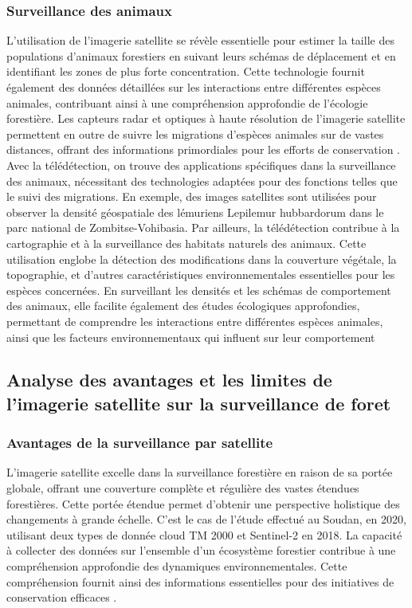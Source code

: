\subsubsection{Surveillance des animaux}
L'utilisation de l'imagerie satellite se révèle essentielle pour estimer la taille des populations d'animaux forestiers en suivant leurs schémas de déplacement et en identifiant les zones de plus forte concentration. Cette technologie fournit également des données détaillées sur les interactions entre différentes espèces animales, contribuant ainsi à une compréhension approfondie de l'écologie forestière. Les capteurs radar et optiques à haute résolution de l'imagerie satellite permettent en outre de suivre les migrations d'espèces animales sur de vastes distances, offrant des informations primordiales pour les efforts de conservation \cite{42}.
\\

Avec la télédétection, on trouve des applications spécifiques dans la surveillance des animaux, nécessitant des technologies adaptées pour des fonctions telles que le suivi des migrations. En exemple, des images satellites sont utilisées pour observer la densité géospatiale des lémuriens Lepilemur hubbardorum dans le parc national de Zombitse-Vohibasia. Par ailleurs, la télédétection contribue à la cartographie et à la surveillance des habitats naturels des animaux. Cette utilisation englobe la détection des modifications dans la couverture végétale, la topographie, et d'autres caractéristiques environnementales essentielles pour les espèces concernées. En surveillant les densités et les schémas de comportement des animaux, elle facilite également des études écologiques approfondies, permettant de comprendre les interactions entre différentes espèces animales, ainsi que les facteurs environnementaux qui influent sur leur comportement \cite{43}
\\

\subsection{Analyse des avantages et les limites de l’imagerie satellite sur la surveillance de foret }
\subsubsection{Avantages de la surveillance par satellite}
L'imagerie satellite excelle dans la surveillance forestière en raison de sa portée globale, offrant une couverture complète et régulière des vastes étendues forestières. Cette portée étendue permet d'obtenir une perspective holistique des changements à grande échelle. C’est le cas de l’étude effectué au Soudan, en 2020, utilisant deux types de donnée cloud TM 2000 et Sentinel-2 en 2018. La capacité à collecter des données sur l'ensemble d'un écosystème forestier contribue à une compréhension approfondie des dynamiques environnementales. Cette compréhension fournit ainsi des informations essentielles pour des initiatives de conservation efficaces \cite{44}. 
\\


